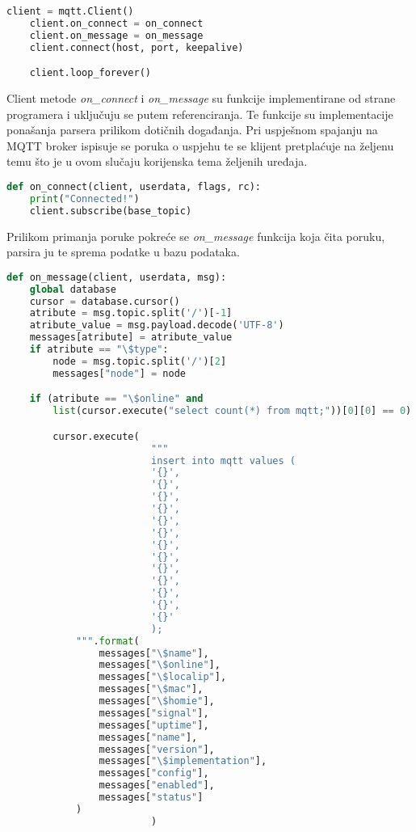 \documentclass[times, utf8, zavrsni]{fer}
\begin{document}
{\begin{lstlisting}[language=Python, caption=Main funkcija programskog koda]
    client = mqtt.Client()
    client.on_connect = on_connect
    client.on_message = on_message
    client.connect(host, port, keepalive)

    client.loop_forever()
\end{lstlisting}
Client metode \textit{on\_connect} i \textit{on\_message} su funkcije implementirane od strane programera i uključuju se putem referenciranja.
Te funkcije su implementacije ponašanja parsera prilikom dotičnih događanja.
Pri uspješnom spajanju na MQTT broker ispisuje se poruka o uspjehu te se klijent pretplaćuje na željenu temu što je u ovom slučaju korijenska tema željenih uređaja.
\begin{lstlisting}[language=Python, caption=Akcije prilikom spajanja na MQTT broker]
def on_connect(client, userdata, flags, rc):
    print("Connected!")
    client.subscribe(base_topic)
\end{lstlisting}
Prilikom primanja poruke pokreće se \textit{on\_message} funkcija koja čita poruku, parsira ju te sprema podatke u bazu podataka.
\begin{lstlisting}[language=Python, caption=Parsiranje poruka i spremanje u bazu podataka]
def on_message(client, userdata, msg):
    global database
    cursor = database.cursor()
    atribute = msg.topic.split('/')[-1]
    atribute_value = msg.payload.decode('UTF-8')
    messages[atribute] = atribute_value
    if atribute == "\$type":
        node = msg.topic.split('/')[2]
        messages["node"] = node

    if (atribute == "\$online" and
        list(cursor.execute("select count(*) from mqtt;"))[0][0] == 0):

        cursor.execute(
                         """
                         insert into mqtt values (
                         '{}',
                         '{}',
                         '{}',
                         '{}',
                         '{}',
                         '{}',
                         '{}',
                         '{}',
                         '{}',
                         '{}',
                         '{}',
                         '{}',
                         '{}'
                         );
            """.format(
                messages["\$name"],
                messages["\$online"],
                messages["\$localip"],
                messages["\$mac"],
                messages["\$homie"],
                messages["signal"],
                messages["uptime"],
                messages["name"],
                messages["version"],
                messages["\$implementation"],
                messages["config"],
                messages["enabled"],
                messages["status"]
            )
                         )


\end{lstlisting}}
\end{document}
